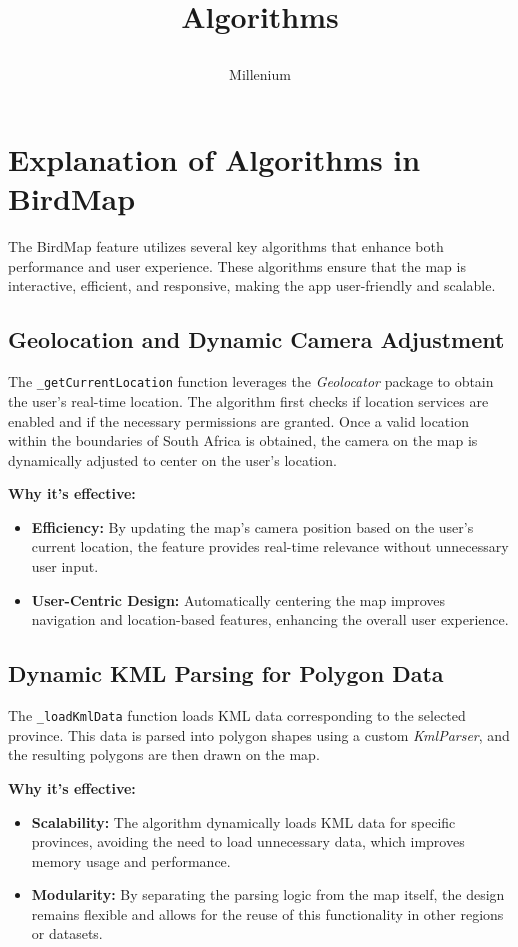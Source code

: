 \documentclass{article}
\title{

\\
{Algorithms}
}
\author{Millenium}
\begin{document}
\tableofcontents

\newpage

\section{Explanation of Algorithms in BirdMap}

The BirdMap feature utilizes several key algorithms that enhance both performance and user experience. These algorithms ensure that the map is interactive, efficient, and responsive, making the app user-friendly and scalable.

\subsection{Geolocation and Dynamic Camera Adjustment}
The \texttt{\_getCurrentLocation} function leverages the \textit{Geolocator} package to obtain the user’s real-time location. The algorithm first checks if location services are enabled and if the necessary permissions are granted. Once a valid location within the boundaries of South Africa is obtained, the camera on the map is dynamically adjusted to center on the user’s location.

\textbf{Why it's effective:}
\begin{itemize}
    \item \textbf{Efficiency:} By updating the map's camera position based on the user’s current location, the feature provides real-time relevance without unnecessary user input.
    \item \textbf{User-Centric Design:} Automatically centering the map improves navigation and location-based features, enhancing the overall user experience.
\end{itemize}

\subsection{Dynamic KML Parsing for Polygon Data}
The \texttt{\_loadKmlData} function loads KML data corresponding to the selected province. This data is parsed into polygon shapes using a custom \textit{KmlParser}, and the resulting polygons are then drawn on the map.

\textbf{Why it's effective:}
\begin{itemize}
    \item \textbf{Scalability:} The algorithm dynamically loads KML data for specific provinces, avoiding the need to load unnecessary data, which improves memory usage and performance.
    \item \textbf{Modularity:} By separating the parsing logic from the map itself, the design remains flexible and allows for the reuse of this functionality in other regions or datasets.
\end{itemize}
\end{document}
